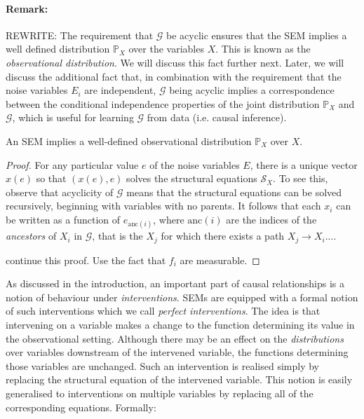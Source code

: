 \paragraph{Remark:} REWRITE:
The requirement that $\mathcal{G}$ be acyclic ensures that the SEM implies a well defined distribution $\mathbb{P}_X$ over the variables $X$. This is known as the \emph{observational distribution}. We will discuss this fact further next. Later, we will discuss the additional fact that, in combination with the requirement that the noise variables $E_i$ are independent, $\mathcal{G}$ being acyclic implies a correspondence between the conditional independence properties of the joint distribution $\mathbb{P}_X$ and $\mathcal{G}$, which is useful for learning $\mathcal{G}$ from data (i.e. causal inference). 

\begin{lemma}\label{lemma:acyclic-sem-well-defined-obs-dist}
An SEM implies a well-defined observational distribution $\mathbb{P}_X$ over $X$.
\end{lemma}
\begin{proof}
For any particular value $e$ of the noise variables $E$, there is a unique vector $x(e)$ so that $(x(e), e)$ solves the structural equations $\mathcal{S}_X$. To see this, observe that acyclicity of $\mathcal{G}$ means that the structural equations can be solved recursively, beginning with variables with no parents. It follows that each $x_i$ can be written as a function of $e_{\text{anc}(i)}$, where $\text{anc}(i)$ are the indices of the \emph{ancestors} of $X_i$ in $\mathcal{G}$, that is the $X_j$ for which there exists a path $X_j \to X_i$....

continue this proof. Use the fact that $f_i$ are measurable.
\end{proof}

As discussed in the introduction, an important part of causal relationships is a notion of behaviour under \emph{interventions}. SEMs are equipped with a formal notion of such interventions which we call \emph{perfect interventions}. The idea is that intervening on a variable makes a change to the function determining its value in the observational setting.  Although there may be an effect on the \emph{distributions} over variables downstream of the intervened variable, the functions determining those variables are unchanged. Such an intervention is realised simply by replacing the structural equation of the intervened variable. This notion is easily generalised to interventions on multiple variables by replacing all of the corresponding equations. Formally:

